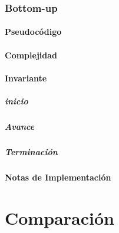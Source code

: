 \documentclass[]{article}
\numberwithin{equation}{section}
\numberwithin{figure}{section}
\theoremstyle{definition}
\begin{document}
\section*{Bottom-up}

	\subsection*{Pseudocódigo}
	
	\subsection*{Complejidad}
	
	\subsection*{Invariante}
	
	\subsubsection*{inicio}
	\subsubsection*{Avance}
	\subsubsection*{Terminación}
	
	\subsection*{Notas de Implementación}
	
	

\part*{Comparación}
\end{document}
